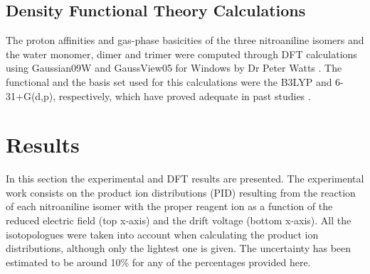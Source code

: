 \subsection{Density Functional Theory Calculations}
The proton affinities and gas-phase basicities of the three nitroaniline isomers and the water monomer, dimer and trimer were computed through DFT calculations using Gaussian09W and GaussView05 for Windows by Dr Peter Watts \cite{frisch2009gaussian}. 
The functional and the basis set used for this calculations were the B3LYP and 6-31+G(d,p), respectively, which have proved adequate in past studies \cite{GonzalezMendez2017939,gonzalez2017ion}.


\section{Results}
In this section the experimental and DFT results are presented. 
The experimental work consists on the product ion distributions (PID) resulting from the reaction of each nitroaniline isomer with the proper reagent ion as a function of the reduced electric field (top x-axis) and the drift voltage (bottom x-axis).
All the isotopologues were taken into account when calculating the product ion distributions, although only the lightest one is given.
The uncertainty has been estimated to be around 10\% for any of the percentages provided here.%


